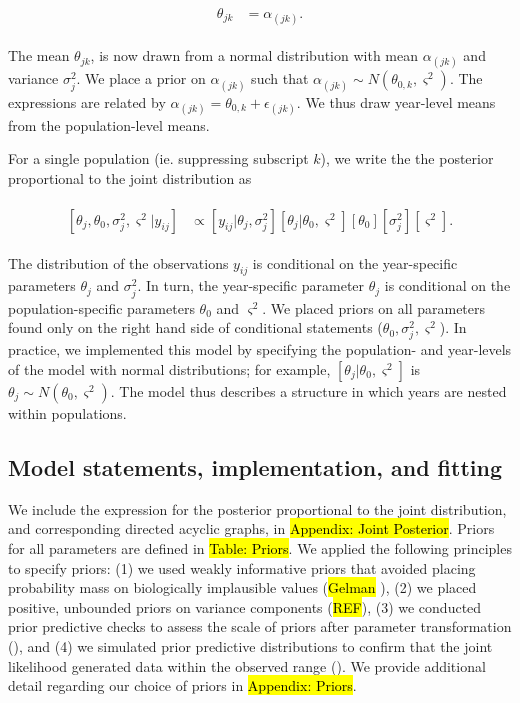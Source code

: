\documentclass[12pt, oneside, titlepage]{article}   	%
\begin{document}
{\begin{align}
  \begin{split}
  \theta_{jk} &  = \alpha_{(jk)}.
  \end{split}
\end{align}

The mean $\theta_{jk}$, is now drawn from a normal distribution with mean $\alpha_{(jk)}$ and variance $\sigma^2_j$. We place a prior on $\alpha_{(jk)}$ such that $\alpha_{(jk)}\sim N(\theta_{0,k}, \varsigma^2)$. The expressions are related by $\alpha_{(jk)}=\theta_{0,k}+\epsilon_{(jk)}$. We thus draw year-level means from the population-level means. 

For a single population (ie. suppressing subscript $k$), we write the the posterior proportional to the joint distribution as

\begin{align}
  \begin{split}
  [ \theta_j , \theta_0 , \sigma_j^2 , \varsigma^2 | y_{ij} ] &  \propto [ y_{ij} | \theta_j , \sigma^2_j] [ \theta_j | \theta_0 , \varsigma^2 ] [ \theta_0 ] [ \sigma^2_j] [ \varsigma^2].
  \end{split}
\end{align}

The distribution of the observations $y_{ij}$ is conditional on the year-specific parameters $\theta_j$ and $\sigma^2_j$. In turn, the year-specific parameter $\theta_j$ is conditional on the population-specific parameters $\theta_0$ and $ \varsigma^2$. We placed priors on all parameters found only on the right hand side of conditional statements ($\theta_0, \sigma^2_j, \varsigma^2$). In practice, we implemented this model by specifying the population- and year-levels of the model with normal distributions; for example, $[ \theta_j | \theta_0 , \varsigma^2 ]$ is $\theta_j \sim N(\theta_0, \varsigma^2)$. The model thus describes a structure in which years are nested within populations.

\subsection{Model statements, implementation, and fitting}

We include the expression for the posterior proportional to the joint distribution, and corresponding directed acyclic graphs, in \hl{Appendix: Joint Posterior}. Priors for all parameters are defined in \hl{Table: Priors}. We applied the following principles to specify priors: (1) we used weakly informative priors that avoided placing probability mass on biologically implausible values (\hl{Gelman} \cite{lemoine2019,wesner2020}), (2) we placed positive, unbounded priors on variance components (\hl{REF}), (3) we conducted prior predictive checks to assess the scale of priors after parameter transformation (\cite{hobbs2015b,gabry2019,wesner2020}), and (4) we simulated prior predictive distributions to confirm that the joint likelihood generated data within the observed range (\cite{gabry2019,conn2018,hobbs2015b}). We provide additional detail regarding our choice of priors in \hl{Appendix: Priors}. 

}
\end{document}
